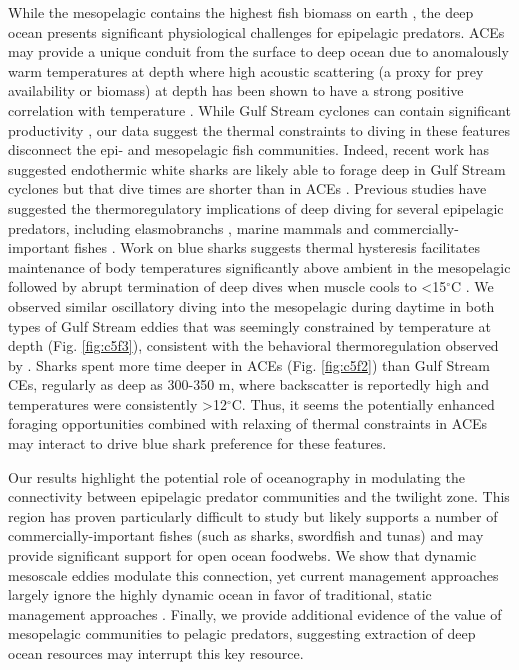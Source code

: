 While the mesopelagic contains the highest fish biomass on earth \citep{Irigoien2014}, the deep ocean presents significant physiological challenges for epipelagic predators. ACEs may provide a unique conduit from the surface to deep ocean due to anomalously warm temperatures at depth where high acoustic scattering (a proxy for prey availability or biomass) at depth has been shown to have a strong positive correlation with temperature \citep{Fennell2015}. While Gulf Stream cyclones can contain significant productivity \citep{Gaube2017DSR}, our data suggest the thermal constraints to diving in these features disconnect the epi- and mesopelagic fish communities. Indeed, recent work has suggested endothermic white sharks are likely able to forage deep in Gulf Stream cyclones but that dive times are shorter than in ACEs \citep{Gaube2018}. Previous studies have suggested the thermoregulatory implications of deep diving for several epipelagic predators, including elasmobranchs \citep{Thorrold2014}, marine mammals \citep{Tyack2006} and commercially-important fishes \citep{Carey1982}. Work on blue sharks suggests thermal hysteresis facilitates maintenance of body temperatures significantly above ambient in the mesopelagic followed by abrupt termination of deep dives when muscle cools to <15$^\circ$C \citep{Carey1990}. We observed similar oscillatory diving into the mesopelagic during daytime in both types of Gulf Stream eddies that was seemingly constrained by temperature at depth (Fig. \ref{fig:c5f3}), consistent with the behavioral thermoregulation observed by \cite{Carey1990}. Sharks spent more time deeper in ACEs (Fig. \ref{fig:c5f2}) than Gulf Stream CEs, regularly as deep as 300-350 m, where backscatter is reportedly high \citep{Fennell2015} and temperatures were consistently >12$^\circ$C. Thus, it seems the potentially enhanced foraging opportunities combined with relaxing of thermal constraints in ACEs may interact to drive blue shark preference for these features.

Our results highlight the potential role of oceanography in modulating the connectivity between epipelagic predator communities and the twilight zone. This region has proven particularly difficult to study but likely supports a number of commercially-important fishes (such as sharks, swordfish and tunas) and may provide significant support for open ocean foodwebs. We show that dynamic mesoscale eddies modulate this connection, yet current management approaches largely ignore the highly dynamic ocean in favor of traditional, static management approaches \citep{Maxwell2015}. Finally, we provide additional evidence of the value of mesopelagic communities to pelagic predators, suggesting extraction of deep ocean resources may interrupt this key resource.

